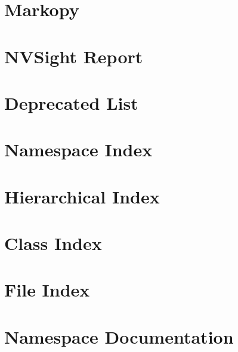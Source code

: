\let\mypdfximage\pdfximage\def\pdfximage{\immediate\mypdfximage}\documentclass[twoside]{book}
\newcommand{\+}{\discretionary{\mbox{\scriptsize$\hookleftarrow$}}{}{}}
\begin{document}
\chapter{Markopy}
\label{index}\hypertarget{index}{}
\chapter{NVSight Report}
\label{md__markopy__n_v_sight_report}

\chapter{Deprecated List}
\label{deprecated}

\chapter{Namespace Index}

\chapter{Hierarchical Index}

\chapter{Class Index}

\chapter{File Index}

\chapter{Namespace Documentation}




























\end{document}

